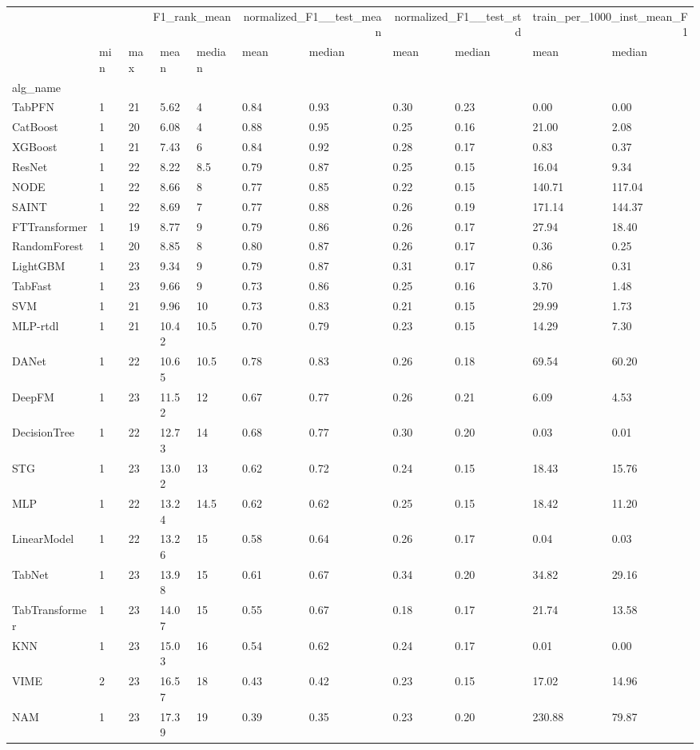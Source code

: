 \begin{tabular}{lllllllllll}
\toprule
 & \multicolumn{4}{r}{F1_rank_mean} & \multicolumn{2}{r}{normalized_F1__test_mean} & \multicolumn{2}{r}{normalized_F1__test_std} & \multicolumn{2}{r}{train_per_1000_inst_mean_F1} \\
 & min & max & mean & median & mean & median & mean & median & mean & median \\
alg_name &  &  &  &  &  &  &  &  &  &  \\
\midrule
TabPFN & 1 & 21 & 5.62 & 4 & 0.84 & 0.93 & 0.30 & 0.23 & 0.00 & 0.00 \\
CatBoost & 1 & 20 & 6.08 & 4 & 0.88 & 0.95 & 0.25 & 0.16 & 21.00 & 2.08 \\
XGBoost & 1 & 21 & 7.43 & 6 & 0.84 & 0.92 & 0.28 & 0.17 & 0.83 & 0.37 \\
ResNet & 1 & 22 & 8.22 & 8.5 & 0.79 & 0.87 & 0.25 & 0.15 & 16.04 & 9.34 \\
NODE & 1 & 22 & 8.66 & 8 & 0.77 & 0.85 & 0.22 & 0.15 & 140.71 & 117.04 \\
SAINT & 1 & 22 & 8.69 & 7 & 0.77 & 0.88 & 0.26 & 0.19 & 171.14 & 144.37 \\
FTTransformer & 1 & 19 & 8.77 & 9 & 0.79 & 0.86 & 0.26 & 0.17 & 27.94 & 18.40 \\
RandomForest & 1 & 20 & 8.85 & 8 & 0.80 & 0.87 & 0.26 & 0.17 & 0.36 & 0.25 \\
LightGBM & 1 & 23 & 9.34 & 9 & 0.79 & 0.87 & 0.31 & 0.17 & 0.86 & 0.31 \\
TabFast & 1 & 23 & 9.66 & 9 & 0.73 & 0.86 & 0.25 & 0.16 & 3.70 & 1.48 \\
SVM & 1 & 21 & 9.96 & 10 & 0.73 & 0.83 & 0.21 & 0.15 & 29.99 & 1.73 \\
MLP-rtdl & 1 & 21 & 10.42 & 10.5 & 0.70 & 0.79 & 0.23 & 0.15 & 14.29 & 7.30 \\
DANet & 1 & 22 & 10.65 & 10.5 & 0.78 & 0.83 & 0.26 & 0.18 & 69.54 & 60.20 \\
DeepFM & 1 & 23 & 11.52 & 12 & 0.67 & 0.77 & 0.26 & 0.21 & 6.09 & 4.53 \\
DecisionTree & 1 & 22 & 12.73 & 14 & 0.68 & 0.77 & 0.30 & 0.20 & 0.03 & 0.01 \\
STG & 1 & 23 & 13.02 & 13 & 0.62 & 0.72 & 0.24 & 0.15 & 18.43 & 15.76 \\
MLP & 1 & 22 & 13.24 & 14.5 & 0.62 & 0.62 & 0.25 & 0.15 & 18.42 & 11.20 \\
LinearModel & 1 & 22 & 13.26 & 15 & 0.58 & 0.64 & 0.26 & 0.17 & 0.04 & 0.03 \\
TabNet & 1 & 23 & 13.98 & 15 & 0.61 & 0.67 & 0.34 & 0.20 & 34.82 & 29.16 \\
TabTransformer & 1 & 23 & 14.07 & 15 & 0.55 & 0.67 & 0.18 & 0.17 & 21.74 & 13.58 \\
KNN & 1 & 23 & 15.03 & 16 & 0.54 & 0.62 & 0.24 & 0.17 & 0.01 & 0.00 \\
VIME & 2 & 23 & 16.57 & 18 & 0.43 & 0.42 & 0.23 & 0.15 & 17.02 & 14.96 \\
NAM & 1 & 23 & 17.39 & 19 & 0.39 & 0.35 & 0.23 & 0.20 & 230.88 & 79.87 \\
\bottomrule
\end{tabular}

